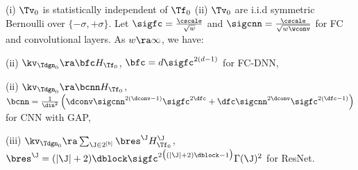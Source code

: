\begin{theorem}\label{th:main} (i) $\Tv_0$ is statistically independent of $\Tf_0$ (ii) $\Tv_0$ are i.i.d symmetric Bernoulli over $\{-{\sigma},+{\sigma}\}$. Let $\sigfc=\frac{\cscale}{\sqrt{w}}$ and $\sigcnn=\frac{\cscale}{\sqrt{w\wconv}}$ for FC and convolutional layers. As $w\ra\infty$, we have: 

(ii) $\kv_{\Tdgn_0}\ra \bfc H_{\Tf_0}$, $\bfc =d \sigfc^{2(d-1)}$ for FC-DNN,

(ii) $\kv_{\Tdgn_0}\ra \bcnn H_{\Tf_0}$, $\bcnn = \frac{1}{{\din}^2} \left(\dconv \sigcnn^{2(\dconv-1)}\sigfc^{2\dfc}+\dfc \sigcnn^{2\dconv}\sigfc^{2(\dfc-1)}\right)$ for  CNN with GAP,

(iii) $\kv_{\Tdgn_0}\ra \sum_{\J\in 2^{[b]}}  \bres^{\J} H^{\J}_{\Tf_0}$, $\bres^{\J} = (|\J| +2)\dblock \sigfc^{2\big( (|\J|+2)\dblock-1\big)} \Gamma(\J)^2$ for ResNet.
\end{theorem}

